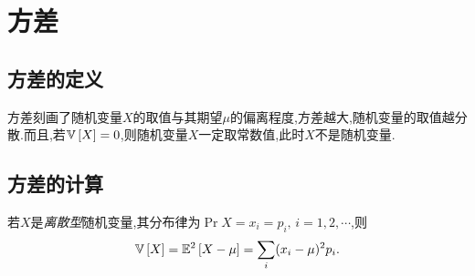 \section{方差}
\subsection{方差的定义}
方差刻画了随机变量$X$的取值与其期望$\mu$的偏离程度,方差越大,随机变量的取值越分散.而且,若$\Var{X} = 0$,则随机变量$X$一定取常数值,此时$X$不是随机变量.
\subsection{方差的计算}
若$X$是\emph{离散型}随机变量,其分布律为$\Pr{X=x_i} = p_i,\,i=1,2,\cdots$,则
\begin{equation}
    \Var{X} = \EE[2]{X-\mu} = \sum_{i}(x_i-\mu)^2p_i.
\end{equation}

